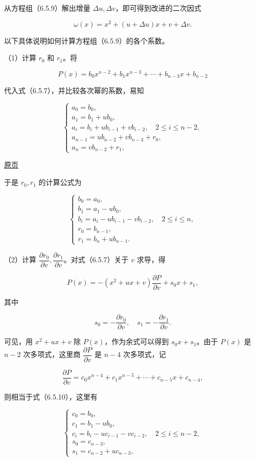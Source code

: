 \documentclass[
  10pt,
  fontset=fandol]{ctexart}
\begin{document}
从方程组（6.5.9）解出增量 \(\Delta u,\Delta v\)，即可得到改进的二次因式

\[
\omega(x)=x^2+(u+\Delta u)x+v+\Delta v.
\]

以下具体说明如何计算方程组（6.5.9）的各个系数。

（1）计算 \(r_0\) 和 \(r_1\)。将

\[
P(x)=b_0x^{n-2}+b_1x^{n-3}+\cdots+b_{n-3}x+b_{n-2}
\]

代入式（6.5.7），并比较各次幂的系数，易知

\[
\begin{cases}
a_0=b_0,\\
a_1=b_1+ub_0,\\
a_i=b_i+ub_{i-1}+vb_{i-2},\quad2\leqslant i\leqslant n-2,\\
a_{n-1}=ub_{n-2}+vb_{n-3}+r_0,\\
a_n=vb_{n-2}+r_1,
\end{cases}
\]

\href{../../source-images/pdf-174.jpeg}{原页}

于是 \(r_0,r_1\) 的计算公式为

\[
\begin{cases}
b_0=a_0,\\
b_1=a_1-ub_0,\\
b_i=a_i-ub_{i-1}-vb_{i-2},\quad2\leqslant i\leqslant n,\\
r_0=b_{n-1},\\
r_1=b_n+ub_{n-1}.
\end{cases}
\tag{6.5.10}
\]

（2）计算 \(\dfrac{\partial r_0}{\partial v},\dfrac{\partial r_1}{\partial v}\)。对式（6.5.7）关于 \(v\) 求导，得

\[
P(x)=-(x^2+ux+v)\frac{\partial P}{\partial v}+s_0x+s_1,
\tag{6.5.11}
\]

其中

\[
s_0=-\frac{\partial r_0}{\partial v},\quad s_1=-\frac{\partial r_1}{\partial v}.
\tag{6.5.12}
\]

可见，用 \(x^2+ux+v\) 除 \(P(x)\)，作为余式可以得到 \(s_0x+s_1\)。由于 \(P(x)\) 是 \(n-2\) 次多项式，这里商 \(\dfrac{\partial P}{\partial v}\) 是 \(n-4\) 次多项式，记

\[
\frac{\partial P}{\partial v}=c_0x^{n-4}+c_1x^{n-5}+\cdots+c_{n-5}x+c_{n-4},
\]

则相当于式（6.5.10），这里有

\[
\begin{cases}
c_0=b_0,\\
c_1=b_1-ub_0,\\
c_i=b_i-uc_{i-1}-vc_{i-2},\quad2\leqslant i\leqslant n-2,\\
s_0=c_{n-3},\\
s_1=c_{n-2}+uc_{n-3},
\end{cases}
\]
\end{document}
